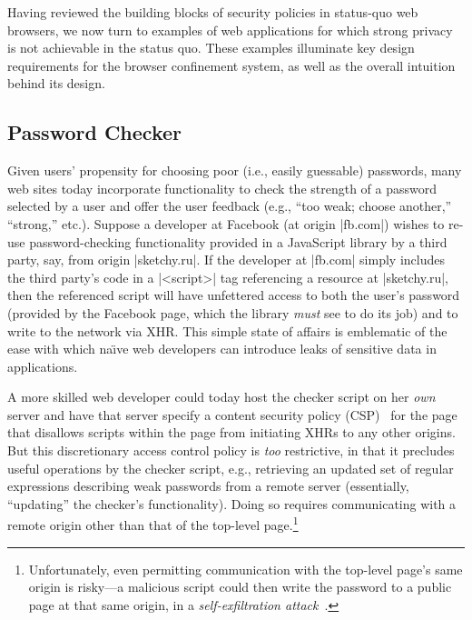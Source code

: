 Having reviewed the building blocks of security policies in status-quo
web browsers, we now turn to examples of web applications for which
strong privacy is not achievable in the status quo. These examples
illuminate key design requirements for the \sys{} browser confinement
system, as well as the overall intuition behind its design.

\subsection{Password Checker}

Given users' propensity for choosing poor (i.e., easily guessable)
passwords, many web sites today incorporate functionality to check the
strength of a password selected by a user and offer the user feedback
(e.g., ``too weak; choose another,'' ``strong,'' etc.). Suppose a
developer at Facebook (at origin \js|fb.com|) wishes to re-use
password-checking functionality provided in a JavaScript library by a
third party, say, from origin \js|sketchy.ru|. If the developer at
\js|fb.com| simply includes the third party's code in a \js|<script>|
tag referencing a resource at \js|sketchy.ru|, then the referenced
script will have unfettered access to both the user's password
(provided by the Facebook page, which the library {\em must} see to do
its job) and to write to the network via XHR. This simple state of
affairs is emblematic of the ease with which na\"{\i}ve web developers can
introduce leaks of sensitive data in applications.

A more skilled web developer could today host the checker script on
her {\em own} server and have that server specify a content security
policy (CSP)~\cite{csp} for the page that disallows scripts within the
page from initiating XHRs to any other origins. But this discretionary
access control policy is {\em too} restrictive, in that it precludes
useful operations by the checker script, e.g., retrieving an updated
set of regular expressions describing weak passwords from a remote
server (essentially, ``updating'' the checker's functionality). Doing
so requires communicating with a remote origin other than that of the
top-level page.\footnote{Unfortunately, even permitting communication
  with the top-level page's same origin is risky---a malicious script
  could then write the password to a public page at that same origin,
  in a {\em self-exfiltration attack}~\cite{selfex}.}

